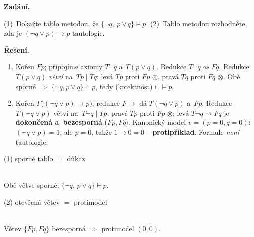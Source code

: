 \documentclass[11pt,a4paper]{article}
\newcommand{\closed}{\ensuremath{\otimes}}            %
\newcommand{\open}{\textcolor{green!45!black}{\faCheck}} %
\begin{document}
\begin{priklad}
\textbf{Zadání.}\par
(1)~Dokažte tablo metodou, že $\{\neg q,\ p\vee q\}\models p$. (2)~Tablo metodou rozhodněte, zda je $(\neg q\vee p)\to p$ tautologie.

\smallskip
\textbf{Řešení.}
\begin{enumerate}[label=(\arabic*)]
  \item Kořen $Fp$; připojíme axiomy $T\neg q$ a~$T(p\vee q)$. Redukce $T\neg q\rightsquigarrow Fq$. Redukce $T(p\vee q)$ \emph{větví} na~$Tp\mid Tq$: levá $Tp$ proti $Fp$ \closed, pravá $Tq$ proti $Fq$ \closed. Obě sporné $\Rightarrow$ $\{\neg q,p\vee q\}\vdash p$, tedy (korektnost) i~$\models p$.
  \item Kořen $F\big((\neg q\vee p)\to p\big)$; redukce $F{\to}$ dá $T(\neg q\vee p)$ a~$Fp$. Redukce $T(\neg q\vee p)$ větví na~$T\neg q\mid Tp$: pravá $Tp$ proti $Fp$ \closed; levá $T\neg q\rightsquigarrow Fq$ je \textbf{dokončená a~bezesporná} ($Fp,Fq$). Kanonický model $v=(p{=}0,q{=}0)$: $(\neg q\vee p)=1$, ale $p=0$, takže $1\to 0=0$ -- \textbf{protipříklad}. Formule \emph{není} tautologie.
\end{enumerate}

\smallskip
\begin{minipage}[t]{0.46\linewidth}\centering
{\small (1) sporné tablo $=$ důkaz}\\[1mm]
\\[0.5mm]
{\footnotesize Obě větve sporné: $\{\neg q,\,p\vee q\}\vdash p$.}
\end{minipage}\hfill
\begin{minipage}[t]{0.46\linewidth}\centering
{\small (2) otevřená větev $=$ protimodel}\\[1mm]
\\[0.5mm]
{\footnotesize Větev $\{Fp,Fq\}$ bezesporná $\Rightarrow$ protimodel $(0,0)$.}
\end{minipage}
\end{priklad}
\end{document}
